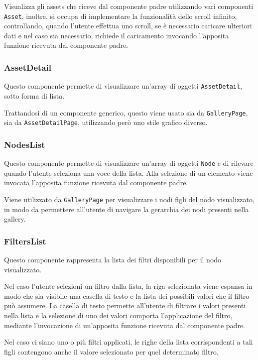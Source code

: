 Visualizza gli assets che riceve dal componente padre utilizzando vari componenti \texttt{Asset}, inoltre, si occupa di implementare la funzionalità dello scroll infinito, controllando, quando l'utente effettua uno scroll, se è necessario caricare ulteriori dati e nel caso sia necessario, richiede il caricamento invocando l'apposita funzione ricevuta dal componente padre.

\subsubsection{AssetDetail}

Questo componente permette di visualizzare un'array di oggetti \texttt{AssetDetail}, sotto forma di lista.

Trattandosi di un componente generico, questo viene usato sia da \texttt{GalleryPage}, sia da \texttt{AssetDetailPage}, utilizzando però uno stile grafico diverso.

\subsubsection{NodesList}

Questo componente permette di visualizzare un'array di oggetti \texttt{Node} e di rilevare quando l'utente seleziona una voce della lista.
Alla selezione di un elemento viene invocata l'apposita funzione ricevuta dal componente padre.

Viene utilizzato da \texttt{GalleryPage} per visualizzare i nodi figli del nodo visualizzato, in modo da permettere all'utente di navigare la gerarchia dei nodi presenti nella gallery.
 
\subsubsection{FiltersList}

Questo componente rappresenta la lista dei filtri disponibili per il nodo visualizzato.

Nel caso l'utente selezioni un filtro dalla lista, la riga selezionata viene espansa in modo che sia visibile una casella di testo e la lista dei possibili valori che il filtro può assumere.
La casella di testo permette all'utente di filtrare i valori presenti nella lista e la selezione di uno dei valori comporta l'applicazione del filtro, mediante l'invocazione di un'apposita funzione ricevuta dal componente padre.

Nel caso ci siano uno o più filtri applicati, le righe della lista corrispondenti a tali figli contengono anche il valore selezionato per quel determinato filtro.

